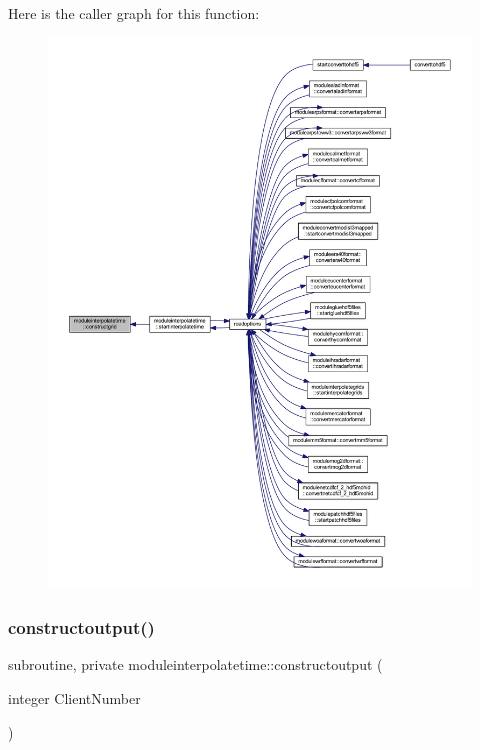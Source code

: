 Here is the caller graph for this function\+:\nopagebreak
\begin{figure}[H]
\begin{center}
\leavevmode
\includegraphics[width=350pt]{namespacemoduleinterpolatetime_ae85e58c7f2328078eb15ab901ab2cec2_icgraph}
\end{center}
\end{figure}
\mbox{\label{namespacemoduleinterpolatetime_af73c04e1fcd85cc293ad3c88c2420ff2}} 
\subsubsection{\texorpdfstring{constructoutput()}{constructoutput()}}
{\footnotesize\ttfamily subroutine, private moduleinterpolatetime\+::constructoutput (\begin{DoxyParamCaption}\item[{integer}]{Client\+Number }\end{DoxyParamCaption})\hspace{0.3cm}{\ttfamily [private]}}

